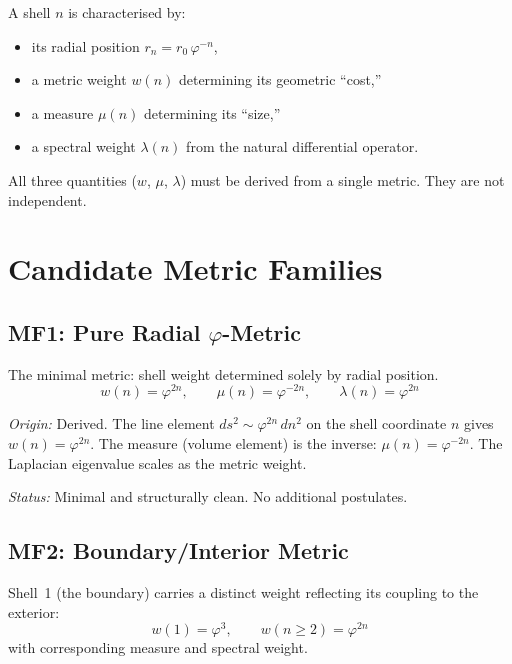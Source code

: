 \documentclass[12pt]{article}
\newcommand{\phig}{\varphi}
\begin{document}
A shell $n$ is characterised by:
\begin{itemize}
    \item its radial position $r_n = r_0\, \phig^{-n}$,
    \item a metric weight $w(n)$ determining its geometric ``cost,''
    \item a measure $\mu(n)$ determining its ``size,''
    \item a spectral weight $\lambda(n)$ from the natural differential operator.
\end{itemize}

All three quantities ($w$, $\mu$, $\lambda$) must be derived from a single metric. They are not independent.

\section{Candidate Metric Families}\label{sec:metrics}

\subsection{MF1: Pure Radial $\phig$-Metric}

The minimal metric: shell weight determined solely by radial position.
\begin{equation}
    w(n) = \phig^{2n}, \qquad \mu(n) = \phig^{-2n}, \qquad \lambda(n) = \phig^{2n}
\end{equation}

\textit{Origin:} Derived. The line element $ds^2 \sim \phig^{2n}\, dn^2$ on the shell coordinate $n$ gives $w(n) = \phig^{2n}$. The measure (volume element) is the inverse: $\mu(n) = \phig^{-2n}$. The Laplacian eigenvalue scales as the metric weight.

\textit{Status:} Minimal and structurally clean. No additional postulates.

\subsection{MF2: Boundary/Interior Metric}

Shell~1 (the boundary) carries a distinct weight reflecting its coupling to the exterior:
\begin{equation}
    w(1) = \phig^3, \qquad w(n \geq 2) = \phig^{2n}
\end{equation}
with corresponding measure and spectral weight.
\end{document}
